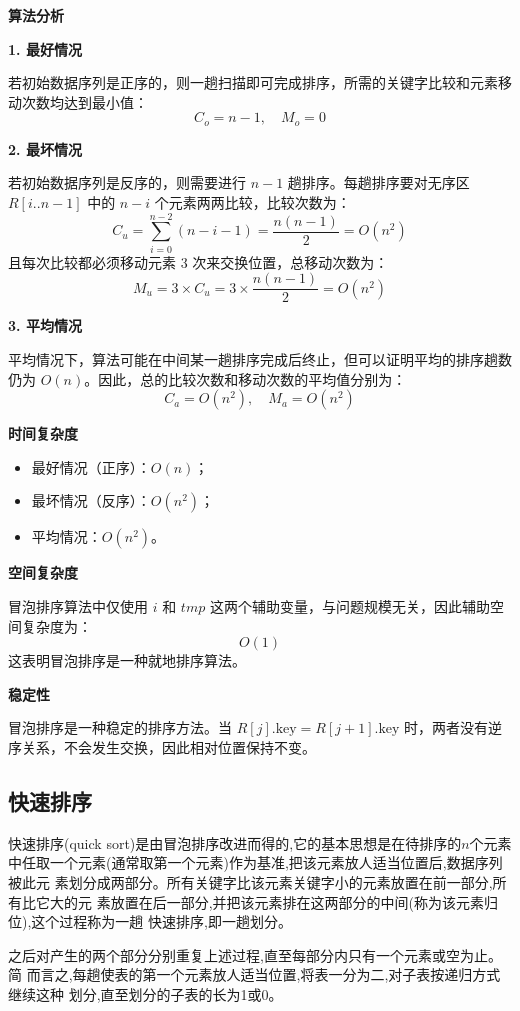 \documentclass[lang=cn,newtx,10pt,scheme=chinese]{../elegantbook}
\begin{document}
\textbf{算法分析}

\textbf{1. 最好情况  }

   若初始数据序列是正序的，则一趟扫描即可完成排序，所需的关键字比较和元素移动次数均达到最小值：
   \[
   C_o = n - 1, \quad M_o = 0
   \]

\textbf{2. 最坏情况  }

   若初始数据序列是反序的，则需要进行 $n - 1$ 趟排序。每趟排序要对无序区 $R[i..n-1]$ 中的 $n - i$ 个元素两两比较，比较次数为：
   \[
   C_u = \sum_{i=0}^{n-2} (n - i - 1) = \frac{n(n-1)}{2} = O(n^2)
   \]
   且每次比较都必须移动元素 3 次来交换位置，总移动次数为：
   \[
   M_u = 3 \times C_u = 3 \times \frac{n(n-1)}{2} = O(n^2)
   \]

  \textbf{3. 平均情况  }

   平均情况下，算法可能在中间某一趟排序完成后终止，但可以证明平均的排序趟数仍为 $O(n)$。因此，总的比较次数和移动次数的平均值分别为：
   \[
   C_a = O(n^2), \quad M_a = O(n^2)
   \]

\textbf{时间复杂度 }

\begin{itemize}
  \item 最好情况（正序）：$O(n)$；
  \item 最坏情况（反序）：$O(n^2)$；
  \item 平均情况：$O(n^2)$。
\end{itemize}

\textbf{空间复杂度 } 

冒泡排序算法中仅使用 $i$ 和 $tmp$ 这两个辅助变量，与问题规模无关，因此辅助空间复杂度为：
\[
O(1)
\]
这表明冒泡排序是一种就地排序算法。

\textbf{稳定性 }  

冒泡排序是一种稳定的排序方法。当 $R[j].\text{key} = R[j+1].\text{key}$ 时，两者没有逆序关系，不会发生交换，因此相对位置保持不变。


\subsection{快速排序}

 

快速排序(quick sort)是由冒泡排序改进而得的,它的基本思想是在待排序的$n$个元素
中任取一个元素(通常取第一个元素)作为基准,把该元素放人适当位置后,数据序列被此元
素划分成两部分。所有关键字比该元素关键字小的元素放置在前一部分,所有比它大的元
素放置在后一部分,并把该元素排在这两部分的中间(称为该元素归位),这个过程称为一趟
快速排序,即一趟划分。

之后对产生的两个部分分别重复上述过程,直至每部分内只有一个元素或空为止。简
而言之,每趟使表的第一个元素放人适当位置,将表一分为二,对子表按递归方式继续这种
划分,直至划分的子表的长为1或0。
\end{document}
